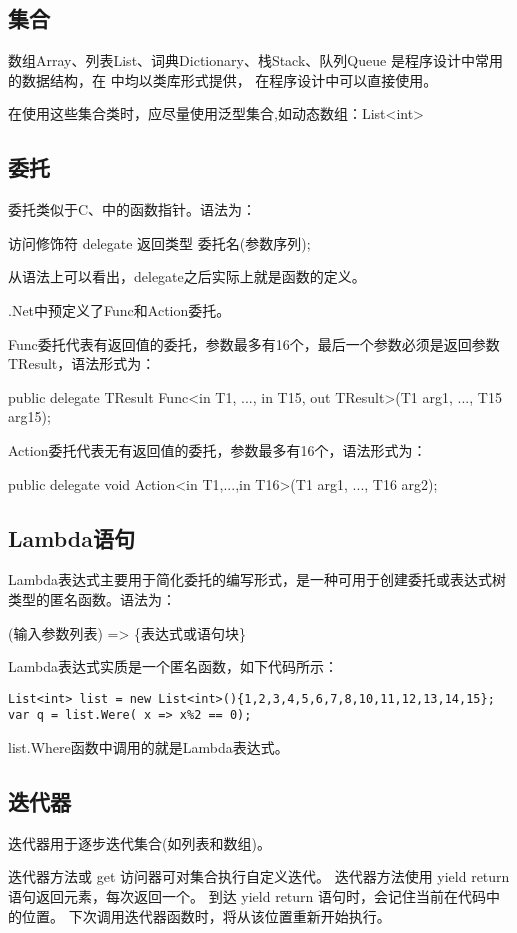 \subsection{集合}
数组Array、列表List、词典Dictionary、栈Stack、队列Queue 
是程序设计中常用的数据结构，在 \cs 中均以类库形式提供，
在\cs 程序设计中可以直接使用。

在使用这些集合类时，应尽量使用泛型集合,如动态数组：List<int>

\subsection{委托}
委托类似于C、\cpp 中的函数指针。语法为：

访问修饰符 delegate 返回类型 委托名(参数序列);

从语法上可以看出，delegate之后实际上就是函数的定义。

.Net中预定义了Func和Action委托。

Func委托代表有返回值的委托，参数最多有16个，最后一个参数必须是返回参数TResult，语法形式为：

public delegate TResult Func<in T1, ..., in T15, out TResult>(T1 arg1, ..., T15 arg15);

Action委托代表无有返回值的委托，参数最多有16个，语法形式为：

public delegate void Action<in T1,...,in T16>(T1 arg1, ..., T16 arg2);

\subsection{Lambda语句}
Lambda表达式主要用于简化委托的编写形式，是一种可用于创建委托或表达式树类型的匿名函数。语法为：

(输入参数列表) => \{表达式或语句块\}

Lambda表达式实质是一个匿名函数，如下代码所示：
\begin{lstlisting}
List<int> list = new List<int>(){1,2,3,4,5,6,7,8,10,11,12,13,14,15};
var q = list.Were( x => x%2 == 0);
\end{lstlisting}
list.Where函数中调用的就是Lambda表达式。

\subsection{迭代器}

迭代器用于逐步迭代集合(如列表和数组)。

迭代器方法或 get 访问器可对集合执行自定义迭代。 迭代器方法使用 yield return 语句返回元素，每次返回一个。 到达 yield return 语句时，会记住当前在代码中的位置。 下次调用迭代器函数时，将从该位置重新开始执行。

